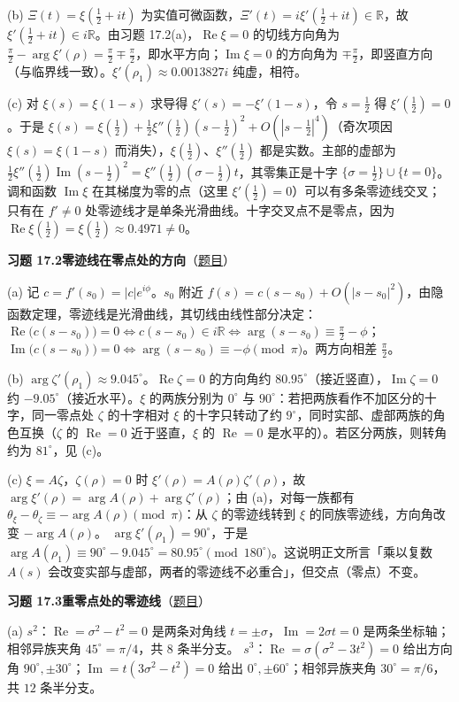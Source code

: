 \documentclass[11pt,a4paper]{article}
\newcommand{\RR}{\mathbb{R}}
\renewcommand{\Re}{\operatorname{Re}}
\renewcommand{\Im}{\operatorname{Im}}
\newcommand{\Sol}[2]{%
  \par\addvspace{1.2em}\noindent
  \hypertarget{s:#1}{}\textbf{习题 #1\quad #2}\hfill{\small（\hyperlink{q:#1}{题目}）}\par
  \nopagebreak\smallskip}
\begin{document}
(b) $\Xi(t)=\xi(\frac12+it)$ 为实值可微函数，$\Xi'(t)=i\xi'(\frac12+it)\in\RR$，故 $\xi'(\frac12+it)\in i\RR$。由习题 17.2(a)，$\Re\xi=0$ 的切线方向角为 $\frac\pi2-\arg\xi'(\rho)=\frac\pi2\mp\frac\pi2$，即水平方向；$\Im\xi=0$ 的方向角为 $\mp\frac\pi2$，即竖直方向（与临界线一致）。$\xi'(\rho_1)\approx0.0013827i$ 纯虚，相符。

(c) 对 $\xi(s)=\xi(1-s)$ 求导得 $\xi'(s)=-\xi'(1-s)$，令 $s=\frac12$ 得 $\xi'(\frac12)=0$。于是
$\xi(s)=\xi(\frac12)+\frac12\xi''(\frac12)(s-\frac12)^2+O(|s-\frac12|^4)$（奇次项因 $\xi(s)=\xi(1-s)$ 而消失），$\xi(\frac12)$、$\xi''(\frac12)$ 都是实数。主部的虚部为
$\frac12\xi''(\frac12)\Im(s-\frac12)^2=\xi''(\frac12)(\sigma-\frac12)t$，其零集正是十字 $\{\sigma=\frac12\}\cup\{t=0\}$。
调和函数 $\Im\xi$ 在其梯度为零的点（这里 $\xi'(\frac12)=0$）可以有多条零迹线交叉；只有在 $f'\neq0$ 处零迹线才是单条光滑曲线。十字交叉点不是零点，因为 $\Re\xi(\frac12)=\xi(\frac12)\approx0.4971\neq0$。

\Sol{17.2}{零迹线在零点处的方向}
(a) 记 $c=f'(s_0)=|c|e^{i\phi}$。$s_0$ 附近 $f(s)=c(s-s_0)+O(|s-s_0|^2)$，由隐函数定理，零迹线是光滑曲线，其切线由线性部分决定：
$\Re\bigl(c(s-s_0)\bigr)=0\iff c(s-s_0)\in i\RR\iff\arg(s-s_0)\equiv\frac\pi2-\phi$；
$\Im\bigl(c(s-s_0)\bigr)=0\iff\arg(s-s_0)\equiv-\phi\pmod\pi$。两方向相差 $\frac\pi2$。

(b) $\arg\zeta'(\rho_1)\approx9.045^\circ$。$\Re\zeta=0$ 的方向角约 $80.95^\circ$（接近竖直），$\Im\zeta=0$ 约 $-9.05^\circ$（接近水平）。$\xi$ 的两族分别为 $0^\circ$ 与 $90^\circ$：若把两族看作不加区分的十字，同一零点处 $\zeta$ 的十字相对 $\xi$ 的十字只转动了约 $9^\circ$，同时实部、虚部两族的角色互换（$\zeta$ 的 $\Re=0$ 近于竖直，$\xi$ 的 $\Re=0$ 是水平的）。若区分两族，则转角约为 $81^\circ$，见 (c)。

(c) $\xi=A\zeta$，$\zeta(\rho)=0$ 时 $\xi'(\rho)=A(\rho)\zeta'(\rho)$，故 $\arg\xi'(\rho)=\arg A(\rho)+\arg\zeta'(\rho)$；由 (a)，对每一族都有 $\theta_\xi-\theta_\zeta\equiv-\arg A(\rho)\pmod\pi$：从 $\zeta$ 的零迹线转到 $\xi$ 的同族零迹线，方向角改变 $-\arg A(\rho)$。
$\arg\xi'(\rho_1)=90^\circ$，于是 $\arg A(\rho_1)\equiv90^\circ-9.045^\circ=80.95^\circ\pmod{180^\circ}$。这说明正文所言「乘以复数 $A(s)$ 会改变实部与虚部，两者的零迹线不必重合」，但交点（零点）不变。

\Sol{17.3}{重零点处的零迹线}
(a) $s^2$：$\Re=\sigma^2-t^2=0$ 是两条对角线 $t=\pm\sigma$，$\Im=2\sigma t=0$ 是两条坐标轴；相邻异族夹角 $45^\circ=\pi/4$，共 $8$ 条半分支。
$s^3$：$\Re=\sigma(\sigma^2-3t^2)=0$ 给出方向角 $90^\circ,\pm30^\circ$；$\Im=t(3\sigma^2-t^2)=0$ 给出 $0^\circ,\pm60^\circ$；相邻异族夹角 $30^\circ=\pi/6$，共 $12$ 条半分支。
\end{document}
